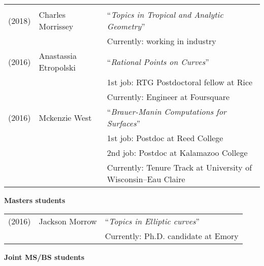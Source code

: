 \documentclass[margin,line]{res}
\newcommand{\defi}[1]{\textsf{#1}} 				%
\begin{document}
\begin{resume}
\begin{tabular}{lll}
    \vspace{4pt}\\
  (2018) & \defi{Charles Morrissey} &   ``\emph{Topics in Tropical and Analytic Geometry}'' \\
         && \hspace{4 pt} Currently: working in industry
    \vspace{4pt}\\
  (2016) & \defi{Anastassia Etropolski} &   ``\emph{Rational Points on Curves}'' \\
         && \hspace{4 pt} 1st job: RTG Postdoctoral fellow at Rice \\
         && \hspace{4 pt} Currently: Engineer at Foursquare
    \vspace{4pt}\\
  (2016) & \defi{Mckenzie West} &   ``\emph{Brauer-Manin Computations for Surfaces}'' \\
         && \hspace{4 pt} 1st job: Postdoc at Reed College\\
         &&  \hspace{4 pt} 2nd job: Postdoc at Kalamazoo College \\
         && \hspace{4 pt} Currently: Tenure Track at University of Wisconsin--Eau Claire



\end{tabular}

{\bf Masters students}

\vspace*{-.15in}

\begin{tabular}{lll}
  (2016) &  Jackson Morrow & ``\emph{Topics in Elliptic curves}'' \\
  & & Currently: Ph.D.  candidate at Emory
\end{tabular}

  
{\bf Joint MS/BS students}
\vspace*{-.15in}


\end{resume}
\end{document}
